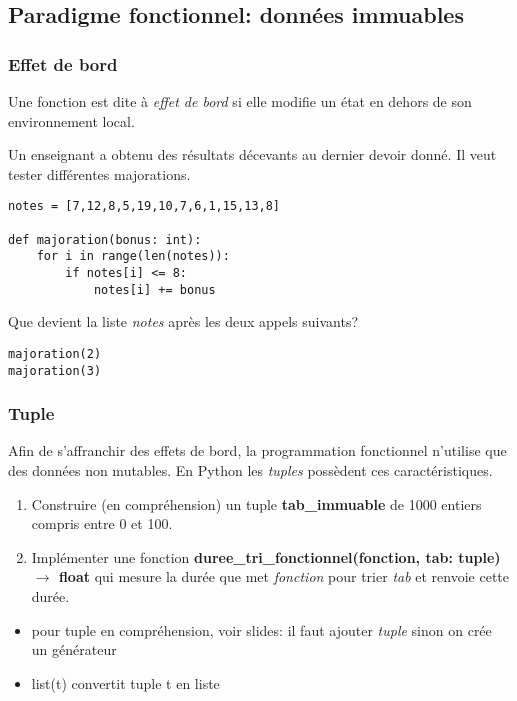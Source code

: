 \documentclass[a4paper,11pt]{article}
\begin{document}
\begin{Form}
\subsection{Paradigme fonctionnel: données immuables}
\subsubsection{Effet de bord}
Une fonction est dite à \emph{effet de bord} si elle modifie un état en dehors de son environnement local.
\begin{activite}
Un enseignant a obtenu des résultats décevants au dernier devoir donné. Il veut tester différentes majorations.
\begin{lstlisting}
notes = [7,12,8,5,19,10,7,6,1,15,13,8]

def majoration(bonus: int):
    for i in range(len(notes)):
        if notes[i] <= 8:
            notes[i] += bonus
\end{lstlisting}
Que devient la liste \emph{notes} après les deux appels suivants?
\begin{lstlisting}
majoration(2)
majoration(3)
\end{lstlisting}
\end{activite}
\subsubsection{Tuple}
Afin de s'affranchir des effets de bord, la programmation fonctionnel n'utilise que des données non mutables. En Python les \emph{tuples} possèdent ces caractéristiques.
\begin{activite}
\begin{enumerate}
\item Construire (en compréhension) un tuple \textbf{tab\_immuable} de 1000 entiers compris entre 0 et 100.
\item Implémenter une fonction \textbf{duree\_tri\_fonctionnel(fonction, tab: tuple) $\rightarrow$ float} qui mesure la durée que met \emph{fonction} pour trier \emph{tab} et renvoie cette durée.
\end{enumerate}
\end{activite}
\begin{commentprof}
\begin{itemize}
\item pour tuple en compréhension, voir slides: il faut ajouter \emph{tuple} sinon on crée un générateur
\item list(t) convertit tuple t en liste
\end{itemize}
\end{commentprof}

\end{Form}
\end{document}
